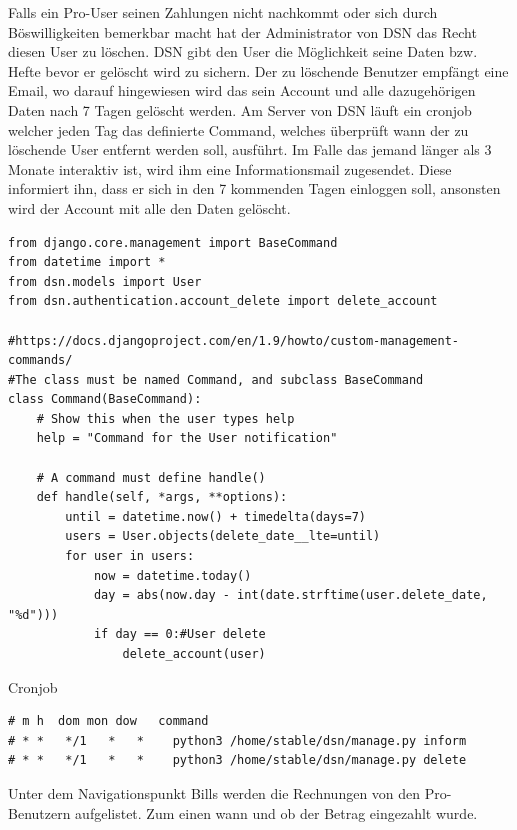 Falls ein Pro-User seinen Zahlungen nicht nachkommt oder sich durch Böswilligkeiten bemerkbar macht hat der Administrator von DSN das Recht diesen User zu löschen. DSN gibt den User die Möglichkeit seine Daten bzw. Hefte bevor er gelöscht wird zu sichern. Der zu löschende Benutzer empfängt eine Email, wo darauf hingewiesen wird das sein Account und alle dazugehörigen Daten nach 7 Tagen gelöscht werden. Am Server von DSN läuft ein cronjob welcher jeden Tag das definierte Command, welches überprüft wann der zu löschende User entfernt werden soll, ausführt. Im Falle das jemand länger als 3 Monate interaktiv ist, wird ihm eine Informationsmail zugesendet. Diese informiert ihn, dass er sich in den 7 kommenden Tagen einloggen soll, ansonsten wird der Account mit alle den Daten gelöscht. \cite{COMMANDS}\cite{CRON}

\begin{lstlisting}
from django.core.management import BaseCommand
from datetime import *
from dsn.models import User
from dsn.authentication.account_delete import delete_account

#https://docs.djangoproject.com/en/1.9/howto/custom-management-commands/
#The class must be named Command, and subclass BaseCommand
class Command(BaseCommand):
    # Show this when the user types help
    help = "Command for the User notification"

    # A command must define handle()
    def handle(self, *args, **options):
        until = datetime.now() + timedelta(days=7)
        users = User.objects(delete_date__lte=until)
        for user in users:
            now = datetime.today()
            day = abs(now.day - int(date.strftime(user.delete_date, "%d")))
            if day == 0:#User delete
                delete_account(user)
\end{lstlisting}

Cronjob
\begin{lstlisting}
# m h  dom mon dow   command
# * *   */1   *   *    python3 /home/stable/dsn/manage.py inform
# * *   */1   *   *    python3 /home/stable/dsn/manage.py delete
\end{lstlisting}

Unter dem Navigationspunkt Bills werden die Rechnungen von den Pro-Benutzern aufgelistet. Zum einen wann und ob der Betrag eingezahlt wurde.